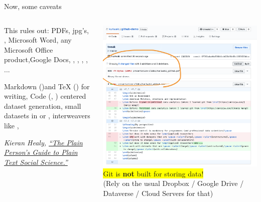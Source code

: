 \documentclass[ignorenonframetext,notes, 10pt, aspectratio=169]{beamer}
\begin{document}
\begin{frame}{Now, some caveats}
\begin{columns}[T]
\begin{column}{0.4\textwidth}

  This rules out:
   \pause PDFs, \pause jpg's, \pause, Microsoft Word, \pause any Microsoft Office product,\pause Google Docs\pause,  , , , , ...

  \bigskip

  \pause Markdown ()and TeX () for writing,  \pause Code (, ) centered dataset generation, small datasets in  or , \pause interweavers  like , \pause


  \emph{Kieran Healy, \href{https://kieranhealy.org/publications/plain-person-text/}{``The Plain Person’s Guide to Plain Text Social Science.''}}
\end{column}
\begin{column}{0.6\textwidth}
\centering
{\includegraphics[width = 0.8\linewidth]{pdf-notrack.png}}
  \colorbox{yellow}{Git is {\textbf{not}} built for storing data!}\pause\\(Rely on the usual Dropbox / Google Drive / Dataverse / Cloud Servers for that)
  \pause
\end{column}
\end{columns}
\end{frame}

\end{document}
